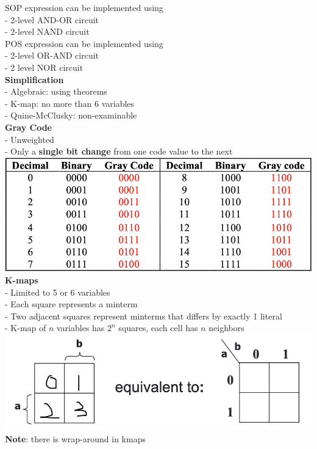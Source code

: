 \documentclass[10pt, a4paper]{article}
\newcommand{\highlight}[1]{{\color{red}\textbf{#1}}}
\begin{document}
\begin{multicols*}{3}
		SOP expression can be implemented using\\
		- 2-level AND-OR circuit\\
		- 2-level NAND circuit\\
		
		POS expression can be implemented using\\
		- 2-level OR-AND circuit\\
		- 2 level NOR circuit\\
		
		{\normalsize\textbf{Simplification}}\\
		- Algebraic: using theorems\\
		- K-map: no more than 6 variables\\
		- Quine-McClusky: non-examinable\\
		
		\textbf{Gray Code}\\
		- Unweighted\\
		- Only a \textbf{single bit change} from one code value to the next\\
		\includegraphics[scale=.5]{./assets/grayCode}\\
		
		\textbf{K-maps}\\
		- Limited to 5 or 6 variables\\
		- Each square represents a minterm\\
		- Two adjacent squares represent minterms that differs by exactly 1 literal\\
		- K-map of $n$ variables has $2^n$ squares, each cell has $n$ neighbors\\
		\includegraphics[scale=.5]{./assets/2VarKMap}\\
		\highlight{Note}: there is wrap-around in kmaps\\
		

\end{multicols*}
\end{document}
